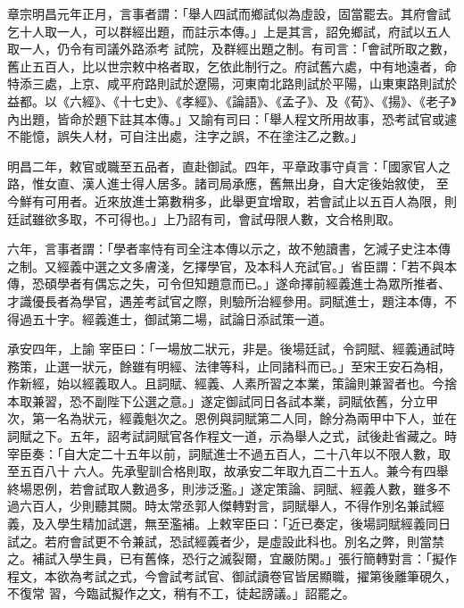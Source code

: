 \begin{pinyinscope}
 章宗明昌元年正月，言事者謂：「舉人四試而鄉試似為虛設，固當罷去。其府會試乞十人取一人，可以群經出題，而註示本傳。」上是其言，詔免鄉試，府試以五人取一人，仍令有司議外路添考
 試院，及群經出題之制。有司言：「會試所取之數，舊止五百人，比以世宗敕中格者取，乞依此制行之。府試舊六處，中有地遠者，命特添三處，上京、咸平府路則試於遼陽，河東南北路則試於平陽，山東東路則試於益都。以《六經》、《十七史》、《孝經》、《論語》、《孟子》、及《荀》、《揚》、《老子》內出題，皆命於題下註其本傳。」又諭有司曰：「舉人程文所用故事，恐考試官或遽不能憶，誤失人材，可自注出處，注字之誤，不在塗注乙之數。」



 明昌二年，敕官或職至五品者，直赴御試。四年，平章政事守貞言：「國家官人之路，惟女直、漢人進士得人居多。諸司局承應，舊無出身，自大定後始敘使，
 至今鮮有可用者。近來放進士第數稍多，此舉更宜增取，若會試止以五百人為限，則廷試雖欲多取，不可得也。」上乃詔有司，會試毋限人數，文合格則取。



 六年，言事者謂：「學者率恃有司全注本傳以示之，故不勉讀書，乞減子史注本傳之制。又經義中選之文多膚淺，乞擇學官，及本科人充試官。」省臣謂：「若不與本傳，恐碩學者有偶忘之失，可令但知題意而已。」遂命擇前經義進士為眾所推者、才識優長者為學官，遇差考試官之際，則驗所治經參用。詞賦進士，題注本傳，不得過五十字。經義進士，御試第二場，試論日添試策一道。



 承安四年，上諭
 宰臣曰：「一場放二狀元，非是。後場廷試，令詞賦、經義通試時務策，止選一狀元，餘雖有明經、法律等科，止同諸科而已。」至宋王安石為相，作新經，始以經義取人。且詞賦、經義、人素所習之本業，策論則兼習者也。今捨本取兼習，恐不副陛下公選之意。」遂定御試同日各試本業，詞賦依舊，分立甲次，第一名為狀元，經義魁次之。恩例與詞賦第二人同，餘分為兩甲中下人，並在詞賦之下。五年，詔考試詞賦官各作程文一道，示為舉人之式，試後赴省藏之。時宰臣奏：「自大定二十五年以前，詞賦進士不過五百人，二十八年以不限人數，取至五百八十
 六人。先承聖訓合格則取，故承安二年取九百二十五人。兼今有四舉終場恩例，若會試取人數過多，則涉泛濫。」遂定策論、詞賦、經義人數，雖多不過六百人，少則聽其闕。時太常丞郭人傑轉對言，詞賦舉人，不得作別名兼試經義，及入學生精加試選，無至濫補。上敕宰臣曰：「近已奏定，後場詞賦經義同日試之。若府會試更不令兼試，恐試經義者少，是虛設此科也。別名之弊，則當禁之。補試入學生員，已有舊條，恐行之滅裂爾，宜嚴防閑。」張行簡轉對言：「擬作程文，本欲為考試之式，今會試考試官、御試讀卷官皆居顯職，擢第後離筆硯久，不復常
 習，今臨試擬作之文，稍有不工，徒起謗議。」詔罷之。




\end{pinyinscope}
